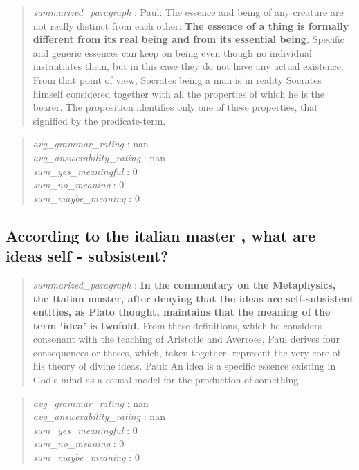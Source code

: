 \begin{quote}
\emph{summarized\_paragraph} : Paul: The essence and being of any
creature are not really distinct from each other. \textbf{The essence of
a thing is formally different from its real being and from its essential
being.} Specific and generic essences can keep on being even though no
individual instantiates them, but in this case they do not have any
actual existence. From that point of view, Socrates being a man is in
reality Socrates himself considered together with all the properties of
which he is the bearer. The proposition identifies only one of these
properties, that signified by the predicate-term.
\end{quote}

\begin{quote}
\emph{avg\_grammar\_rating} : nan\\
\emph{avg\_answerability\_rating} : nan\\
\emph{sum\_yes\_meaningful} : 0\\
\emph{sum\_no\_meaning} : 0\\
\emph{sum\_maybe\_meaning} : 0
\end{quote}

\hypertarget{according-to-the-italian-master-what-are-ideas-self---subsistent}{%
\subsection{According to the italian master , what are ideas self -
subsistent?}\label{according-to-the-italian-master-what-are-ideas-self---subsistent}}

\begin{quote}
\emph{summarized\_paragraph} : \textbf{In the commentary on the
Metaphysics, the Italian master, after denying that the ideas are
self-subsistent entities, as Plato thought, maintains that the meaning
of the term `idea' is twofold.} From these definitions, which he
considers consonant with the teaching of Aristotle and Averroes, Paul
derives four consequences or theses, which, taken together, represent
the very core of his theory of divine ideas. Paul: An idea is a specific
essence existing in God's mind as a causal model for the production of
something.
\end{quote}

\begin{quote}
\emph{avg\_grammar\_rating} : nan\\
\emph{avg\_answerability\_rating} : nan\\
\emph{sum\_yes\_meaningful} : 0\\
\emph{sum\_no\_meaning} : 0\\
\emph{sum\_maybe\_meaning} : 0
\end{quote}

